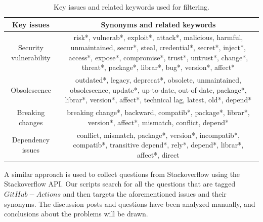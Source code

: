 \documentclass[conference]{IEEEtran}
\begin{document}
    \begin{table}[H]
            \centering
            \caption{Key issues and related keywords used for filtering.}
            \label{tab:related_keywords}
	        \hspace{5cm}
            \begin{tabular}{|c|c|}
              \hline
              \textbf{Key issues} & \textbf{Synonyms and related keywords} \\
              \hline
              Security vulnerability & \parbox[t]{5.5cm}{risk*, vulnerab*, exploit*, attack*, malicious, harmful, unmaintained, secur*, steal, credential*, secret*, inject*, access*, expose*, compromise*, trust*, untrust*, change*, threat*, package*, librar*, bug*,  version*, affect*\\}  \\
             \hline
             Obsolescence & \parbox[t]{5.5cm}{outdated*, legacy, deprecat*, obsolete, unmaintained, obsolescence, update*, up-to-date, out-of-date, package*, librar*, version*, affect*, technical lag, latest, old*, depend*\\}  \\
              \hline
              Breaking changes & \parbox[t]{5.5cm}{breaking change*,  backward, compatib*, package*, librar*, version*, affect*, mismatch, conflict, depend*\\} \\
              \hline
              Dependency issues &  \parbox[t]{5.5cm}{conflict, mismatch, package*, version*, incompatib*, compatib*, transitive depend*, rely*, depend*, librar*, affect*, direct\\}  \\
              \hline
          \end{tabular}
    \end{table}
            A similar approach is used to collect questions from Stackoverflow using the Stackoverflow API. Our scripts search for all the questions that are tagged $GitHub-Actions$ and then targets the aforementioned issues and their synonyms. The discussion posts and questions have been analyzed manually, and conclusions about the problems will be drawn.\\
\end{document}

